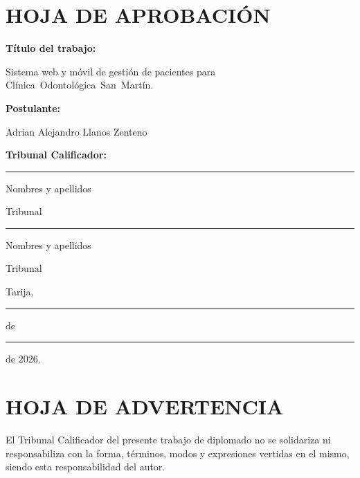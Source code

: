 	\chapter*{HOJA DE APROBACIÓN}
	
	\textbf{Título del trabajo:}
	
	Sistema web y móvil de gestión de pacientes 
	 para \mbox{Clínica Odontológica San Martín}.
	
	\vspace{0.8cm}
	
	\textbf{Postulante:}
	
	Adrian Alejandro Llanos Zenteno
	
	\vspace{1cm}
	
	\textbf{Tribunal Calificador:}
	
	\vspace{2cm}
	
	\begin{center}
		
		\rule{8cm}{0.4pt}
		
		Nombres y apellidos
		
		Tribunal
		
		\vspace{1.8cm}
		
		\rule{8cm}{0.4pt}
		
		Nombres y apellidos
		
		Tribunal
		
		\vspace{2cm}
		
		Tarija, \rule{1cm}{0.4pt} de
		\rule{3cm}{0.4pt} de 2026.
		
	\end{center}
	
	
	
	\clearpage
	
	\chapter*{HOJA DE ADVERTENCIA}
	
	\vfill
	
	\begin{center}
		
		\begin{minipage}{0.65\textwidth}
			
			El Tribunal Calificador del presente trabajo de diplomado no se
			solidariza ni responsabiliza con la forma, términos, modos y
			expresiones vertidas en el mismo, siendo esta responsabilidad
			del autor.
			
		\end{minipage}
		
	\end{center}
	
